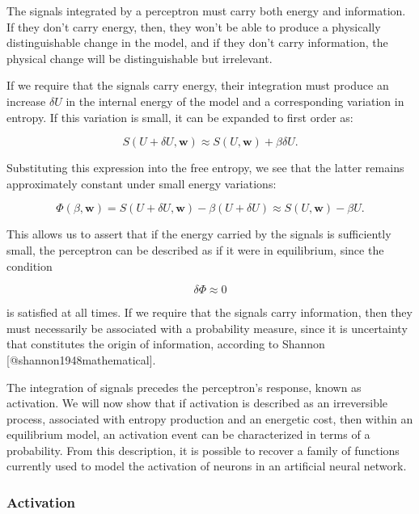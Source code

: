 \documentclass[12pt]{article}
\begin{document}
The signals integrated by a perceptron must carry both energy and information. If they don't carry energy, then, they won't be able to produce a physically distinguishable change in the model, and if they don't carry information, the physical change will be distinguishable but irrelevant.

If we require that the signals carry energy, their integration must produce an increase $\delta U$ in the internal energy of the model and a corresponding variation in entropy. If this variation is small, it can be expanded to first order as:

\begin{equation}
S(U+\delta U, \mathbf{w}) \approx S(U, \mathbf{w}) + \beta \delta U.
\end{equation}

Substituting this expression into the free entropy, we see that the latter remains approximately constant under small energy variations:

\begin{equation}
\Phi(\beta, \mathbf{w}) = S(U + \delta U,\mathbf{w}) - \beta (U + \delta U) \approx S(U, \mathbf{w}) - \beta U.
\end{equation}

This allows us to assert that if the energy carried by the signals is sufficiently small, the perceptron can be described as if it were in equilibrium, since the condition

\begin{equation}
\delta \Phi \approx 0
\end{equation}

is satisfied at all times. If we require that the signals carry information, then they must necessarily be associated with a probability measure, since it is uncertainty that constitutes the origin of information, according to Shannon [@shannon1948mathematical].

The integration of signals precedes the perceptron’s response, known as activation. We will now show that if activation is described as an irreversible process, associated with entropy production and an energetic cost, then within an equilibrium model, an activation event can be characterized in terms of a probability. From this description, it is possible to recover a family of functions currently used to model the activation of neurons in an artificial neural network.

\subsubsection{Activation}
\end{document}
